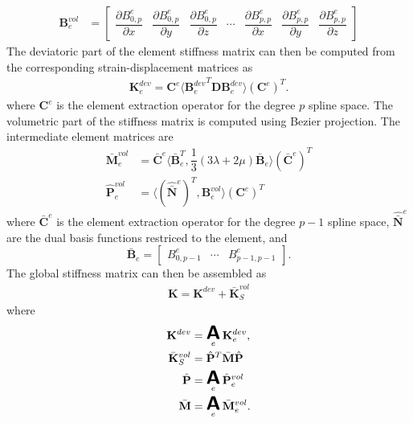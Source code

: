 \begin{align}
    {\mathbf{B}_e^{vol}} & =
    \begin{bmatrix}
        \dfrac{\partial{B}^e_{0,p}}{\partial{x}} & \dfrac{\partial{B}^e_{0,p}}{\partial{y}} & \dfrac{\partial{B}^e_{0,p}}{\partial{z}} & \cdots & \dfrac{\partial{B}^e_{p,p}}{\partial{x}} & \dfrac{\partial{B}^e_{p,p}}{\partial{y}} & \dfrac{\partial{B}^e_{p,p}}{\partial{z}}
    \end{bmatrix}
\end{align}
The deviatoric part of the element stiffness matrix can then be computed from the corresponding strain-displacement matrices as
\begin{align}
    \mathbf{K}_e^{dev}
    =\mathbf{C}^e\langle {\mathbf{B}_{e}^{dev}}^T\mathbf{D}{\mathbf{B}}_{e}^{dev}\rangle (\mathbf{C}^e)^T.
\end{align}
where $\mathbf{C}^e$ is the element extraction operator for the degree $p$ spline space. The volumetric part of the stiffness matrix is computed using Bezier projection. The intermediate element matrices are
\begin{align}
    \bar{\mathbf{M}}^{vol}_e & =\bar{\mathbf{C}}^e\langle{\bar{\mathbf{B}}_e^T,\dfrac{1}{3}(3\lambda+2\mu)\bar{\mathbf{B}}_e}\rangle(\bar{\mathbf{C}}^e)^T \\
    \hat{\mathbf{P}}^{vol}_e & =\langle{(\hat{\bar{\mathbf{N}}}^e)^T, \mathbf{B}_e^{vol}}\rangle(\mathbf{C}^e)^T
\end{align}
where $\bar{\mathbf{C}}^e$ is the element extraction operator for the degree $p-1$ spline space, $\hat{\bar{\mathbf{N}}}^e$ are the dual basis functions restriced to the element, and \begin{equation}
    \bar{\mathbf{B}}_e=
    \begin{bmatrix}
        {B}^e_{0,p-1} & \cdots & {B}^e_{p-1,p-1}
    \end{bmatrix}.
\end{equation}The global stiffness matrix can then be assembled as
\begin{align}
    \mathbf{K} = \mathbf{K}^{dev} + \bar{\mathbf{K}}^{vol}_{S}
\end{align}
where
\begin{align}
    \mathbf{K}^{dev}         & =\A_e\mathbf{K}_e^{dev},                            \\
    \bar{\mathbf{K}}_S^{vol} & =\hat{\mathbf{P}}^T\bar{\mathbf{M}}\hat{\mathbf{P}} \\
    \hat{\mathbf{P}}         & =\A_e\hat{{\mathbf{P}}}^{vol}_e                     \\
    \bar{\mathbf{M}}         & =\A_e\bar{\mathbf{M}}^{vol}_e.
\end{align}
